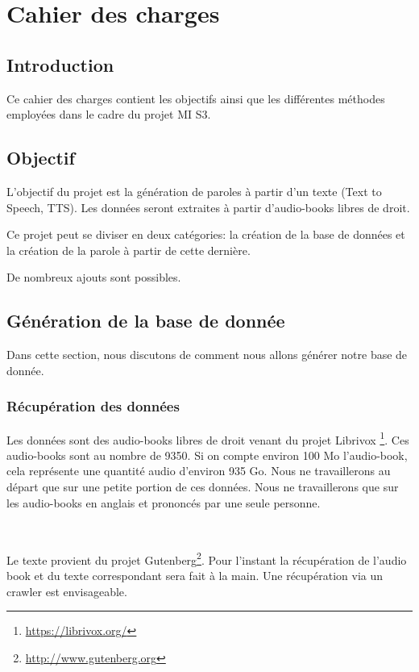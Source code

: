 \chapter{Cahier des charges}
	
	\section*{Introduction}

		Ce cahier des charges contient les objectifs ainsi que les différentes
	méthodes employées dans le cadre du projet MI S3.
	
	\section{Objectif}
	
		L'objectif du projet est la génération de paroles à partir d'un texte
	(Text to Speech, TTS). Les données seront extraites à partir d'audio-books
	libres de droit.
	
		Ce projet peut se diviser en deux catégories: la création de la base de
	données et la création de la parole à partir de cette dernière.
	
		De nombreux ajouts sont possibles.
		
	\section{Génération de la base de donnée}
	
	Dans cette section, nous discutons de comment nous allons générer notre
	base de donnée.
	
		\subsection{Récupération des données}
		
		Les données sont des audio-books libres de droit venant du projet Librivox
	\footnote{\url{https://librivox.org/}}.
	Ces audio-books sont au nombre de 9350. Si on compte environ 100 Mo 
	l'audio-book, cela représente une quantité audio d'environ 935 Go.
	Nous ne travaillerons au départ que sur une petite portion de ces données.
	Nous ne travaillerons que sur les audio-books en anglais et prononcés par une
	seule personne.
	
	~
	
	Le texte provient du projet 
	Gutenberg\footnote{\url{http://www.gutenberg.org}}.
	Pour l'instant la récupération de l'audio book et du texte correspondant
	sera fait à la main. Une récupération via un crawler est envisageable.
	

